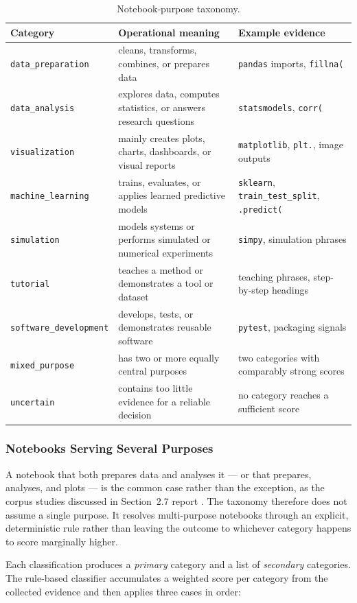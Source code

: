\begin{table}[ht]
\centering
\caption{Notebook-purpose taxonomy.}
\label{tab:classification-taxonomy}
\small
\begin{tabularx}{\textwidth}{@{}p{3.8cm}p{3.7cm}X@{}}
\toprule
Category & Operational meaning & Example evidence\tabularnewline
\midrule
\texttt{data\_preparation} & cleans, transforms, combines, or prepares data & \texttt{pandas} imports, \texttt{fillna(}\tabularnewline
\texttt{data\_analysis} & explores data, computes statistics, or answers research questions & \texttt{statsmodels}, \texttt{corr(}\tabularnewline
\texttt{visualization} & mainly creates plots, charts, dashboards, or visual reports & \texttt{matplotlib}, \texttt{plt.}, image outputs\tabularnewline
\texttt{machine\_learning} & trains, evaluates, or applies learned predictive models & \texttt{sklearn}, \texttt{train\_test\_split}, \texttt{.predict(}\tabularnewline
\texttt{simulation} & models systems or performs simulated or numerical experiments & \texttt{simpy}, simulation phrases\tabularnewline
\texttt{tutorial} & teaches a method or demonstrates a tool or dataset & teaching phrases, step-by-step headings\tabularnewline
\texttt{software\_development} & develops, tests, or demonstrates reusable software & \texttt{pytest}, packaging signals\tabularnewline
\texttt{mixed\_purpose} & has two or more equally central purposes & two categories with comparably strong scores\tabularnewline
\texttt{uncertain} & contains too little evidence for a reliable decision & no category reaches a sufficient score\tabularnewline
\bottomrule
\end{tabularx}
\end{table}

\subsubsection*{Notebooks Serving Several Purposes}

A notebook that both prepares data and analyses it --- or that prepares, analyses, and plots --- is the common case rather than the exception, as the corpus studies discussed in Section~2.7 report \cite{rule2018,kery2018,psallidas2022datascience}. The taxonomy therefore does not assume a single purpose. It resolves multi-purpose notebooks through an explicit, deterministic rule rather than leaving the outcome to whichever category happens to score marginally higher.

Each classification produces a \emph{primary} category and a list of \emph{secondary} categories. The rule-based classifier accumulates a weighted score per category from the collected evidence and then applies three cases in order:

